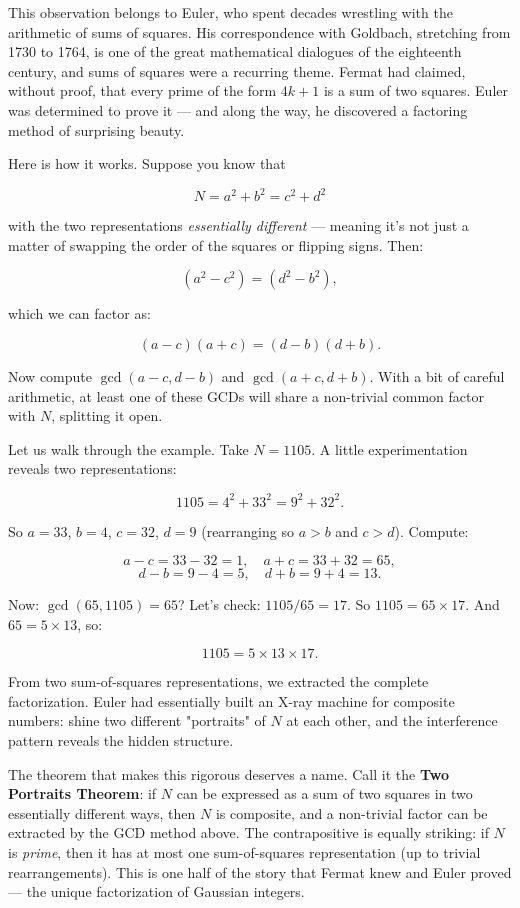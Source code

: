 \documentclass[11pt,twoside,openright]{book}
\theoremstyle{definition}
\theoremstyle{remark}
\begin{document}
This observation belongs to Euler, who spent decades wrestling with the arithmetic of sums of squares. His correspondence with Goldbach, stretching from 1730 to 1764, is one of the great mathematical dialogues of the eighteenth century, and sums of squares were a recurring theme. Fermat had claimed, without proof, that every prime of the form $4k + 1$ is a sum of two squares. Euler was determined to prove it --- and along the way, he discovered a factoring method of surprising beauty.

Here is how it works. Suppose you know that

\[N = a^2 + b^2 = c^2 + d^2\]

with the two representations \textit{essentially different} --- meaning it's not just a matter of swapping the order of the squares or flipping signs. Then:

\[(a^2 - c^2) = (d^2 - b^2),\]

which we can factor as:

\[(a - c)(a + c) = (d - b)(d + b).\]

Now compute $\gcd(a - c, d - b)$ and $\gcd(a + c, d + b)$. With a bit of careful arithmetic, at least one of these GCDs will share a non-trivial common factor with $N$, splitting it open.


Let us walk through the example. Take $N = 1105$. A little experimentation reveals two representations:

\[1105 = 4^2 + 33^2 = 9^2 + 32^2.\]

So $a = 33$, $b = 4$, $c = 32$, $d = 9$ (rearranging so $a > b$ and $c > d$). Compute:

\[a - c = 33 - 32 = 1, \quad a + c = 33 + 32 = 65,\]
\[d - b = 9 - 4 = 5, \quad d + b = 9 + 4 = 13.\]

Now: $\gcd(65, 1105) = 65$? Let's check: $1105 / 65 = 17$. So $1105 = 65 \times 17$. And $65 = 5 \times 13$, so:

\[1105 = 5 \times 13 \times 17.\]

From two sum-of-squares representations, we extracted the complete factorization. Euler had essentially built an X-ray machine for composite numbers: shine two different "portraits" of $N$ at each other, and the interference pattern reveals the hidden structure.


The theorem that makes this rigorous deserves a name. Call it the \textbf{Two Portraits Theorem}: if $N$ can be expressed as a sum of two squares in two essentially different ways, then $N$ is composite, and a non-trivial factor can be extracted by the GCD method above. The contrapositive is equally striking: if $N$ is \textit{prime}, then it has at most one sum-of-squares representation (up to trivial rearrangements). This is one half of the story that Fermat knew and Euler proved --- the unique factorization of Gaussian integers.
\end{document}
